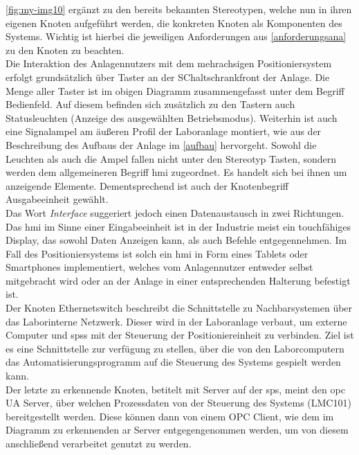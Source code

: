 \documentclass[../Bachelorarbeit.tex]{subfiles}
\begin{document}
\autoref{fig:my-img10} ergänzt zu den bereits bekannten Stereotypen, welche nun in ihren eigenen Knoten aufgeführt werden, die konkreten Knoten als Komponenten des Systems. Wichtig ist hierbei die jeweiligen Anforderungen aus \autoref{anforderungsana} zu den Knoten zu beachten.\\
Die Interaktion des Anlagennutzers mit dem mehrachsigen Positioniersystem erfolgt grundsätzlich über Taster an der SChaltschrankfront der Anlage. Die Menge aller Taster ist im obigen Diagramm zusammengefasst unter dem Begriff Bedienfeld. Auf diesem befinden sich zusätzlich zu den Tastern auch Statusleuchten (Anzeige des ausgewählten Betriebsmodus). Weiterhin ist auch eine Signalampel am äußeren Profil der Laboranlage montiert, wie aus der Beschreibung des Aufbaus der Anlage im \autoref{aufbau} hervorgeht. Sowohl die Leuchten als auch die Ampel fallen nicht unter den Stereotyp Tasten, sondern werden dem allgemeineren Begriff \acf{hmi} zugeordnet. Es handelt sich bei ihnen um anzeigende Elemente. Dementsprechend ist auch der Knotenbegriff Ausgabeeinheit gewählt. \\
Das Wort \textit{Interface} suggeriert jedoch einen Datenaustausch in zwei Richtungen. Das \ac{hmi} im Sinne einer Eingabeeinheit ist in der Industrie meist ein touchfähiges Display, das sowohl Daten Anzeigen kann, als auch Befehle entgegennehmen. Im Fall des Positioniersystems ist solch ein \ac{hmi} in Form eines Tablets oder Smartphones implementiert, welches vom Anlagennutzer entweder selbst mitgebracht wird oder an der Anlage in einer entsprechenden Halterung befestigt ist.\\
Der Knoten Ethernetswitch beschreibt die Schnittstelle zu Nachbarsystemen über das Laborinterne Netzwerk. Dieser wird in der Laboranlage verbaut, um externe Computer und \acsp{sps} mit der Steuerung der Positioniereinheit zu verbinden. Ziel ist es eine Schnittstelle zur verfügung zu stellen, über die von den Laborcomputern das Automatisierungsprogramm auf die Steuerung des Systems gespielt werden kann. \\
Der letzte zu erkennende Knoten, betitelt mit Server auf der \ac{sps}, meint den \ac{opc} UA Server, über welchen Prozessdaten von der Steuerung des Systems (LMC101) bereitgestellt werden. Diese können dann von einem OPC Client, wie \zB dem im Diagramm zu erkennenden \ac{ar} Server entgegengenommen werden, um von diesem anschließend verarbeitet \bzw genutzt zu werden.
\end{document}
